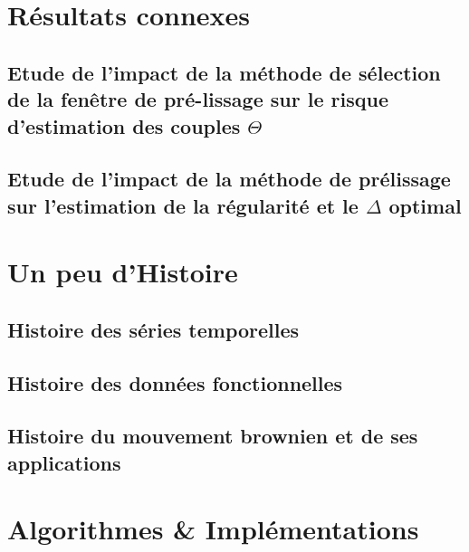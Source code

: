 \chapter{Résultats connexes}

\section{Etude de l'impact de la méthode de sélection de la fenêtre de pré-lissage sur le risque d'estimation des couples $\Theta$}





\section{Etude de l'impact de la méthode de prélissage sur l'estimation de la régularité et le $\Delta$ optimal}
\label{annexe:prelissage_impact}


\chapter{Un peu d'Histoire}
\label{annexe:histoire}
\section{ Histoire des séries temporelles }

\pagebreak
\section{ Histoire des données fonctionnelles }

\pagebreak
\section{Histoire du mouvement brownien et de ses applications}



\pagebreak

% 

\chapter{Algorithmes \& Implémentations}

